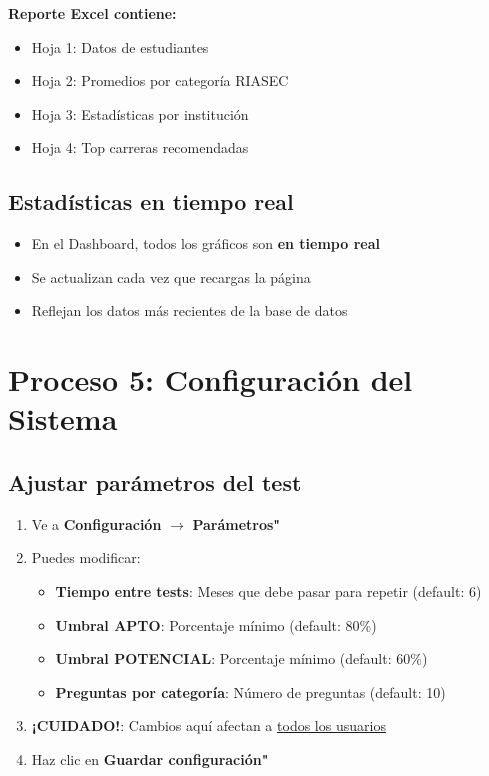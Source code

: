 \documentclass[12pt, a4paper]{report}
\begin{document}
\textbf{Reporte Excel contiene:}
\begin{itemize}
    \item Hoja 1: Datos de estudiantes
    \item Hoja 2: Promedios por categoría RIASEC
    \item Hoja 3: Estadísticas por institución
    \item Hoja 4: Top carreras recomendadas
\end{itemize}

\subsection{Estadísticas en tiempo real}
\begin{itemize}
    \item En el Dashboard, todos los gráficos son \textbf{en tiempo real}
    \item Se actualizan cada vez que recargas la página
    \item Reflejan los datos más recientes de la base de datos
\end{itemize}

\section{Proceso 5: Configuración del Sistema}

\subsection{Ajustar parámetros del test}
\begin{enumerate}
    \item Ve a \textbf{Configuración} $\rightarrow$ \textbf{Parámetros"}
    \item Puedes modificar:
    \begin{itemize}
        \item \textbf{Tiempo entre tests}: Meses que debe pasar para repetir (default: 6)
        \item \textbf{Umbral APTO}: Porcentaje mínimo (default: 80\%)
        \item \textbf{Umbral POTENCIAL}: Porcentaje mínimo (default: 60\%)
        \item \textbf{Preguntas por categoría}: Número de preguntas (default: 10)
    \end{itemize}
    \item \textbf{¡CUIDADO!}: Cambios aquí afectan a \underline{todos los usuarios}
    \item Haz clic en \textbf{Guardar configuración"}
\end{enumerate}
\end{document}
